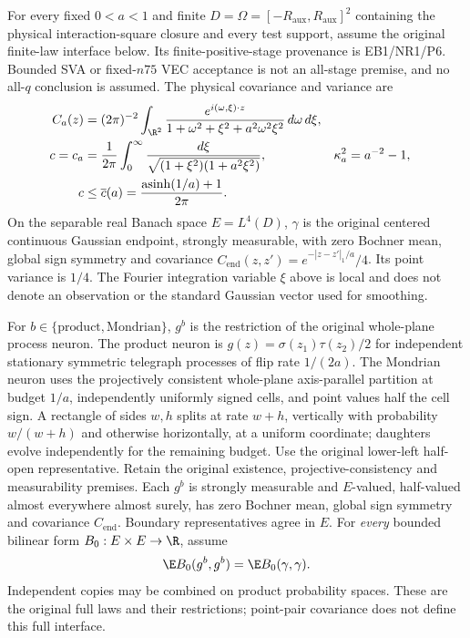 For every fixed $0<a<1$ and finite $D=\Omega=[-R_{\mathrm{aux}},R_{\mathrm{aux}}]^2$
containing the physical interaction-square closure and every test support,
assume the original finite-law interface below. Its finite-positive-stage
provenance is EB1/NR1/P6. Bounded SVA or fixed-$n75$ VEC acceptance is not
an all-stage premise, and no all-$q$ conclusion is assumed. The physical
covariance and variance are
\begin{align*}
 C_a(z)&=(2\pi)^{-2}\int_{\R^2}
 \frac{e^{i(\omega,\xi)\cdot z}}{1+\omega^2+\xi^2+a^2\omega^2\xi^2}
 \,d\omega\,d\xi,\\
 c=c_a&=\frac1{2\pi}\int_0^\infty
 \frac{d\xi}{\sqrt{(1+\xi^2)(1+a^2\xi^2)}},
 &\kappa_a^2&=a^{-2}-1,\\
 c&\le\overline c(a)=\frac{\operatorname{asinh}(1/a)+1}{2\pi}.
\end{align*}
On the separable real Banach space $E=L^4(D)$, $\gamma$ is the original
centered continuous Gaussian endpoint, strongly measurable, with zero
Bochner mean, global sign symmetry and covariance
$C_{\mathrm{end}}(z,z')=e^{-|z-z'|_1/a}/4$. Its point variance is $1/4$.
The Fourier integration variable $\xi$ above is local and does not denote
an observation or the standard Gaussian vector used for smoothing.

For $b\in\{\mathrm{product},\mathrm{Mondrian}\}$, $g^b$ is the restriction
of the original whole-plane process neuron. The product neuron is
$g(z)=\sigma(z_1)\tau(z_2)/2$ for independent stationary symmetric
telegraph processes of flip rate $1/(2a)$. The Mondrian neuron uses the
projectively consistent whole-plane axis-parallel partition at budget
$1/a$, independently uniformly signed cells, and point values half the
cell sign. A rectangle of sides $w,h$ splits at rate $w+h$, vertically
with probability $w/(w+h)$ and otherwise horizontally, at a uniform
coordinate; daughters evolve independently for the remaining budget.
Use the original lower-left half-open representative. Retain the original
existence, projective-consistency and measurability premises. Each $g^b$
is strongly measurable and $E$-valued, half-valued almost everywhere almost
surely, has zero Bochner mean, global sign symmetry and covariance
$C_{\mathrm{end}}$. Boundary representatives agree in $E$. For \emph{every}
bounded bilinear form $B_0:E\times E\to\R$, assume
\[
 \E B_0(g^b,g^b)=\E B_0(\gamma,\gamma).
\]
Independent copies may be combined on product probability spaces. These
are the original full laws and their restrictions; point-pair covariance
does not define this full interface.

